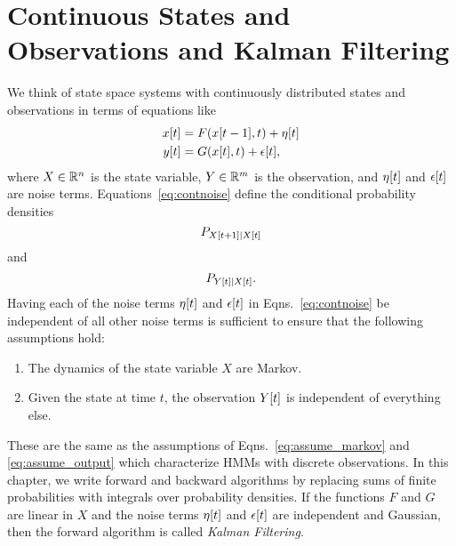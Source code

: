 \chapter{Continuous States and Observations and Kalman Filtering}
\label{chap:continuous}

We think of state space systems with continuously distributed
states and observations in terms of equations like
\begin{subequations}
  \label{eq:contnoise}
  \begin{align}
    {x}{[t]} &= F({x}{[t-1]},t) + {\eta}{[t]}\\
    {y}{[t]}   &= G({x}{[t]},t) + {\epsilon}{[t]},
  \end{align}
\end{subequations}
where $X\in\mathbb{R}^n$ is the state variable, $Y\in\mathbb{R}^m$ is the
observation, and ${\eta}{[t]}$ and ${\epsilon}{[t]}$ are noise
terms.  Equations~\eqref{eq:contnoise} define the conditional
probability densities
\begin{equation}
  \label{eq:Cstatetran}
  P_{{X}{[t+1]}\mid {X}{[t]}}
\end{equation}
and
\begin{equation}
  \label{eq:Cobs}
  P_{{Y}{[t]}\mid {X}{[t]}}.
\end{equation}
Having each of the noise terms ${\eta}{[t]}$ and ${\epsilon}{[t]}$
in Eqns.~\ref{eq:contnoise} be independent of all other noise terms is
sufficient to ensure that the following assumptions hold:
\begin{enumerate}
\item The dynamics of the state variable $X$ are Markov.
\item Given the state at time $t$, the observation ${Y}{[t]}$ is
  independent of everything else.
\end{enumerate}
These are the same as the assumptions of
Eqns.~\eqref{eq:assume_markov} and \eqref{eq:assume_output} which
characterize HMMs with discrete observations.  In this chapter, we
write forward and backward algorithms by replacing sums of finite
probabilities with integrals over probability densities.  If the
functions $F$ and $G$ are linear in $X$ and the noise terms
${\eta}{[t]}$ and ${\epsilon}{[t]}$ are independent and Gaussian,
then the forward algorithm is called \emph{Kalman Filtering}.

